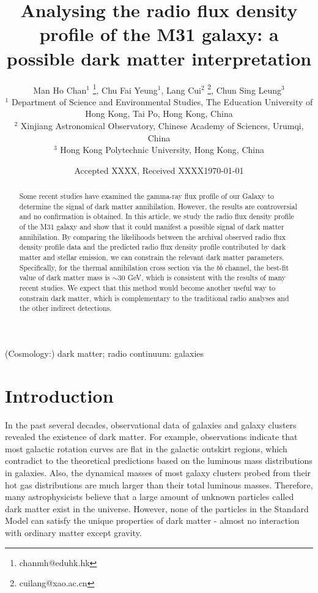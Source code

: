 \documentclass[useAMS,usenatbib]{mn2e}
\title{Analysing the radio flux density profile of the M31 galaxy: a possible dark matter interpretation}
\author[Chan et al.]{Man Ho Chan$^1$ \thanks{chanmh@eduhk.hk}, Chu Fai Yeung$^1$, Lang Cui$^2$ \thanks{cuilang@xao.ac.cn}, Chun Sing Leung$^3$
\\ $^1$ Department of Science and Environmental Studies, The Education University of Hong Kong, Tai Po, Hong Kong, China \\
$^2$ Xinjiang Astronomical Observatory, Chinese Academy of Sciences, Urumqi, China \\
$^3$ Hong Kong Polytechnic University, Hong Kong, China}
\begin{document}
\date{Accepted XXXX, Received XXXX}

\pagerange{\pageref{firstpage}--\pageref{lastpage}} 

\maketitle

\label{firstpage}


\date{\today}

\begin{abstract}
Some recent studies have examined the gamma-ray flux profile of our Galaxy to determine the signal of dark matter annihilation. However, the results are controversial and no confirmation is obtained. In this article, we study the radio flux density profile of the M31 galaxy and show that it could manifest a possible signal of dark matter annihilation. By comparing the likelihoods between the archival observed radio flux density profile data and the predicted radio flux density profile contributed by dark matter and stellar emission, we can constrain the relevant dark matter parameters. Specifically, for the thermal annihilation cross section via the $b\bar{b}$ channel, the best-fit value of dark matter mass is $\sim 30$ GeV, which is consistent with the results of many recent studies. We expect that this method would become another useful way to constrain dark matter, which is complementary to the traditional radio analyses and the other indirect detections.
\end{abstract}

\begin{keywords}
(Cosmology:) dark matter; radio continuum: galaxies
\end{keywords}

\section{Introduction}
In the past several decades, observational data of galaxies and galaxy clusters revealed the existence of dark matter. For example, observations indicate that most galactic rotation curves are flat in the galactic outskirt regions, which contradict to the theoretical predictions based on the luminous mass distributions in galaxies. Also, the dynamical masses of most galaxy clusters probed from their hot gas distributions are much larger than their total luminous masses. Therefore, many astrophysicists believe that a large amount of unknown particles called dark matter exist in the universe. However, none of the particles in the Standard Model can satisfy the unique properties of dark matter - almost no interaction with ordinary matter except gravity.
\end{document}
